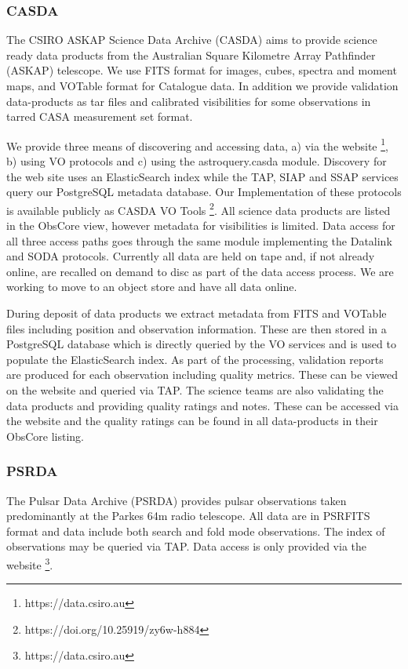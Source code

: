 \documentclass[11pt,a4paper]{ivoa}
\begin{document}
\begin{\itemize}
\subsubsection{CASDA}

The CSIRO ASKAP Science Data Archive (CASDA) aims to provide science ready data products from the Australian Square Kilometre Array Pathfinder (ASKAP) telescope. 
We use FITS format for images, cubes, spectra and moment maps, and VOTable format for Catalogue data. 
In addition we provide validation data-products as tar files and calibrated visibilities for some observations in tarred CASA measurement set format.

We provide three means of discovering and accessing data, a) via the website \footnote{https://data.csiro.au}, b) using VO protocols and c) using the astroquery.casda module. 
Discovery for the web site uses an ElasticSearch index while the TAP, SIAP and SSAP services query our PostgreSQL metadata database. 
Our Implementation of these protocols is available publicly as CASDA VO Tools \footnote{https://doi.org/10.25919/zy6w-h884}.
All science data products are listed in the ObsCore view, however metadata for visibilities is limited. 
Data access for all three access paths goes through the same module implementing the Datalink and SODA protocols. 
Currently all data are held on tape and, if not already online, are recalled on demand to disc as part of the data access process. 
We are working to move to an object store and have all data online.

During deposit of data products we extract metadata from FITS and VOTable files including position and observation information.
These are then stored in a PostgreSQL database which is directly queried by the VO services and is used to populate the ElasticSearch index.
As part of the processing, validation reports are produced for each observation including quality metrics.
These can be viewed on the website and queried via TAP.
The science teams are also validating the data products and providing quality ratings and notes.
These can be accessed via the website and the quality ratings can be found in all data-products in their ObsCore listing.

\subsubsection{PSRDA}

The Pulsar Data Archive (PSRDA) provides pulsar observations taken predominantly at the Parkes 64m radio telescope.
All data are in PSRFITS format and data include both search and fold mode observations.
The index of observations may be queried via TAP. Data access is only provided via the website \footnote{https://data.csiro.au}.


\end{\itemize}
\end{document}
